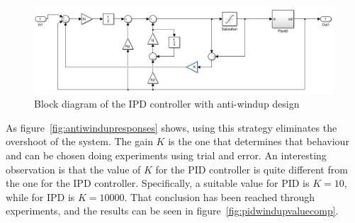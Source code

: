 \begin{figure}[!h]
	\centering
	\includegraphics[width=1\linewidth]{graphics/ipdwindupdesign}
	\caption{Block diagram of the IPD controller with anti-windup design}
	\label{fig:ipdantiwindupstrategy}
\end{figure}

As figure~\ref{fig:antiwindupresponses} shows, using this strategy eliminates the overshoot of the system. The gain $K$ is the one that determines that behaviour and can be chosen doing experiments using trial and error. An interesting observation is that the value of $K$ for the PID controller is quite different from the one for the IPD controller. Specifically, a suitable value for PID is $K=10$, while for IPD is $K=10000$. That conclusion has been reached through experiments, and the results can be seen in figure~\ref{fig:pidwindupvaluecomp}.
